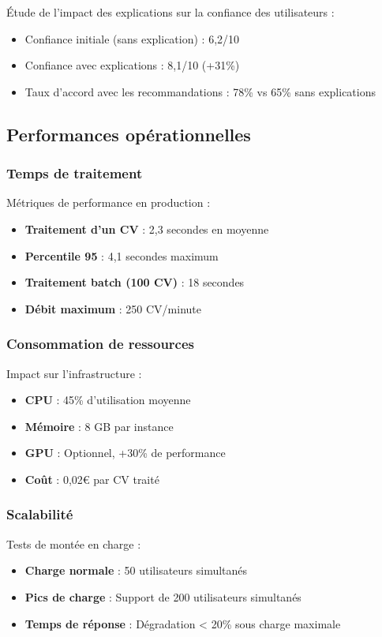 \documentclass[12pt,a4paper]{report}
\begin{document}
Étude de l'impact des explications sur la confiance des utilisateurs :
\begin{itemize}
\item Confiance initiale (sans explication) : 6,2/10
\item Confiance avec explications : 8,1/10 (+31\%)
\item Taux d'accord avec les recommandations : 78\% vs 65\% sans explications
\end{itemize}

\subsection{Performances opérationnelles}

\subsubsection{Temps de traitement}

Métriques de performance en production :
\begin{itemize}
\item \textbf{Traitement d'un CV} : 2,3 secondes en moyenne
\item \textbf{Percentile 95} : 4,1 secondes maximum
\item \textbf{Traitement batch (100 CV)} : 18 secondes
\item \textbf{Débit maximum} : 250 CV/minute
\end{itemize}

\subsubsection{Consommation de ressources}

Impact sur l'infrastructure :
\begin{itemize}
\item \textbf{CPU} : 45\% d'utilisation moyenne
\item \textbf{Mémoire} : 8 GB par instance
\item \textbf{GPU} : Optionnel, +30\% de performance
\item \textbf{Coût} : 0,02€ par CV traité
\end{itemize}

\subsubsection{Scalabilité}

Tests de montée en charge :
\begin{itemize}
\item \textbf{Charge normale} : 50 utilisateurs simultanés
\item \textbf{Pics de charge} : Support de 200 utilisateurs simultanés
\item \textbf{Temps de réponse} : Dégradation < 20\% sous charge maximale
\end{itemize}
\end{document}
